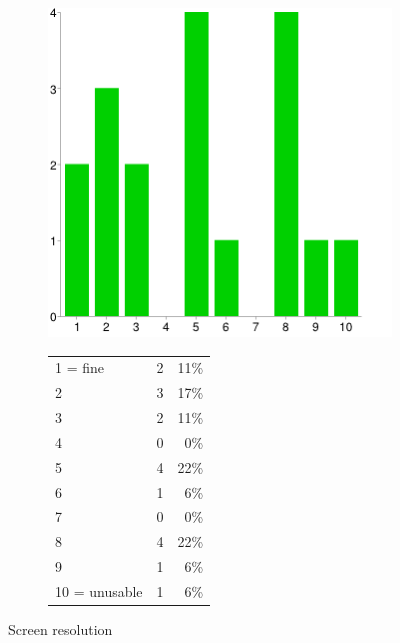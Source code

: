 \documentclass[MSc,paper=a4,pagesize=auto]{icldt}
\begin{document}
\begin{figure}[htbp!]
\centering
\begin{subfigure}{0.4\textwidth}
    \centering
    \includegraphics[width=1\linewidth]{resources/11-screen_resolution}
\end{subfigure}%
\centering
\begin{subfigure}{\textwidth}
    \centering
   	\begin{tabular}{ l c r }
1 = fine&2&11\% \\
2&3&17\% \\
3&2&11\% \\
4&0&0\% \\
5&4&22\% \\
6&1&6\% \\
7&0&0\% \\
8&4&22\% \\
9&1&6\% \\
10 = unusable&1&6\% \\
\end{tabular}
\end{subfigure} 
    \caption{Screen resolution}
    \label{fig:11-screen_resolution}
\end{figure}
\end{document}

